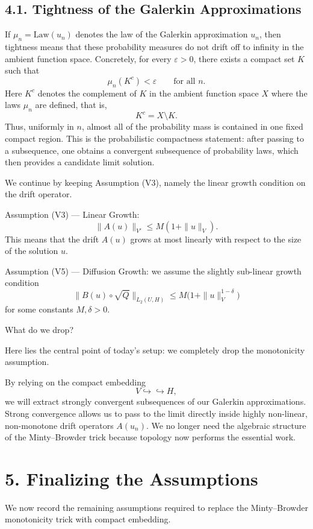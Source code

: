 \documentclass[11pt]{article}
\theoremstyle{definition}
\theoremstyle{remark}
\begin{document}
\subsection*{4.1. Tightness of the Galerkin Approximations}
If $\mu_n=\mathrm{Law}(u_n)$ denotes the law of the Galerkin approximation $u_n$, then tightness means that these probability measures do not drift off to infinity in the ambient function space. Concretely, for every $\varepsilon>0$, there exists a compact set $K$ such that
\[
  \mu_n(K^c)<\varepsilon
  \qquad \text{for all } n.
\]
Here $K^c$ denotes the complement of $K$ in the ambient function space $X$ where the laws $\mu_n$ are defined, that is,
\[
  K^c=X\setminus K.
\]
Thus, uniformly in $n$, almost all of the probability mass is contained in one fixed compact region. This is the probabilistic compactness statement: after passing to a subsequence, one obtains a convergent subsequence of probability laws, which then provides a candidate limit solution.

We continue by keeping Assumption (V3), namely the linear growth condition on the drift operator.

Assumption (V3) --- Linear Growth:
\[
  \|A(u)\|_{V'}\le M(1+\|u\|_V).
\]
This means that the drift $A(u)$ grows at most linearly with respect to the size of the solution $u$.

Assumption (V5) --- Diffusion Growth: we assume the slightly sub-linear growth condition
\[
  \|B(u)\circ \sqrt{Q}\|_{L_2(U,H)} \le M\bigl(1+\|u\|_V^{1-\delta}\bigr)
\]
for some constants $M,\delta>0$.

What do we drop?

Here lies the central point of today's setup: we completely drop the monotonicity assumption.

By relying on the compact embedding
\[
  V \hookrightarrow \hookrightarrow H,
\]
we will extract strongly convergent subsequences of our Galerkin approximations. Strong convergence allows us to pass to the limit directly inside highly non-linear, non-monotone drift operators $A(u_n)$. We no longer need the algebraic structure of the Minty--Browder trick because topology now performs the essential work.

\section*{5. Finalizing the Assumptions}
We now record the remaining assumptions required to replace the Minty--Browder monotonicity trick with compact embedding.
\end{document}
